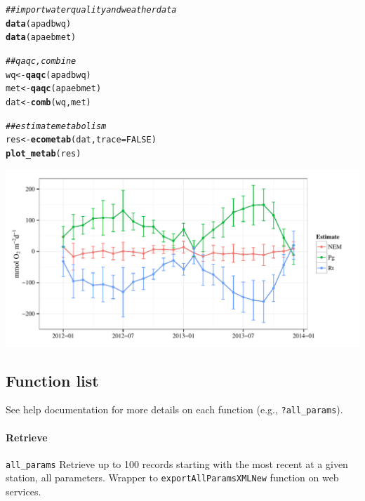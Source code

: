 \documentclass[10pt,letterpaper]{article}\usepackage[]{graphicx}\usepackage[]{color}
\makeatletter
\def\maxwidth{ %
  \ifdim\Gin@nat@width>\linewidth
    \linewidth
  \else
    \Gin@nat@width
  \fi
}
\newcommand{\hlnum}[1]{\textcolor[rgb]{0.686,0.059,0.569}{#1}}%
\newcommand{\hlcom}[1]{\textcolor[rgb]{0.678,0.584,0.686}{\textit{#1}}}%
\newcommand{\hlstd}[1]{\textcolor[rgb]{0.345,0.345,0.345}{#1}}%
\newcommand{\hlkwb}[1]{\textcolor[rgb]{0.69,0.353,0.396}{#1}}%
\newcommand{\hlkwc}[1]{\textcolor[rgb]{0.333,0.667,0.333}{#1}}%
\newcommand{\hlkwd}[1]{\textcolor[rgb]{0.737,0.353,0.396}{\textbf{#1}}}%
\newenvironment{kframe}{%
 \def\at@end@of@kframe{}%
 \ifinner\ifhmode%
  \def\at@end@of@kframe{\end{minipage}}%
  \begin{minipage}{\columnwidth}%
 \fi\fi%
 \def\FrameCommand##1{\hskip\@totalleftmargin \hskip-\fboxsep
 \colorbox{shadecolor}{##1}\hskip-\fboxsep
     \hskip-\linewidth \hskip-\@totalleftmargin \hskip\columnwidth}%
 \MakeFramed {\advance\hsize-\width
   \@totalleftmargin\z@ \linewidth\hsize
   \@setminipage}}%
 {\par\unskip\endMakeFramed%
 \at@end@of@kframe}
\newenvironment{knitrout}{}{} %
\makeatother
\begin{document}
\begin{knitrout}
\color{fgcolor}\begin{kframe}
\begin{alltt}
\hlcom{## import water quality and weather data}
\hlkwd{data}\hlstd{(apadbwq)}
\hlkwd{data}\hlstd{(apaebmet)}

\hlcom{## qaqc, combine}
\hlstd{wq} \hlkwb{<-} \hlkwd{qaqc}\hlstd{(apadbwq)}
\hlstd{met} \hlkwb{<-} \hlkwd{qaqc}\hlstd{(apaebmet)}
\hlstd{dat} \hlkwb{<-} \hlkwd{comb}\hlstd{(wq, met)}

\hlcom{## estimate metabolism}
\hlstd{res} \hlkwb{<-} \hlkwd{ecometab}\hlstd{(dat,} \hlkwc{trace} \hlstd{=} \hlnum{FALSE}\hlstd{)}
\hlkwd{plot_metab}\hlstd{(res)}
\end{alltt}
\end{kframe}

{\centering \includegraphics[width=\maxwidth]{figure/unnamed-chunk-21} 

}



\end{knitrout}

\subsection*{Function list}

See help documentation for more details on each function (e.g., \texttt{?all\_params}).

\paragraph{Retrieve}

\texttt{all\_params} Retrieve up to 100 records starting with the most recent at a given station, all parameters.  Wrapper to \texttt{exportAllParamsXMLNew} function on web services. 
\end{document}
